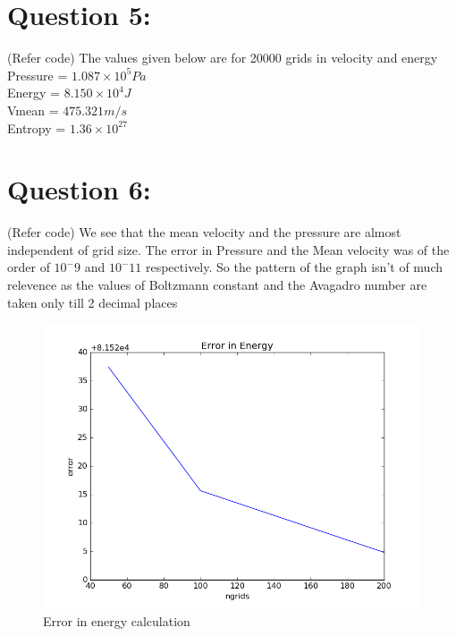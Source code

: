 \documentclass[11pt, a4paper]{article}
\begin{document}
\section{Question 5:}
(Refer code)
The values  given below are for 20000 grids in velocity and energy \\
Pressure = $1.087 \times 10^5 Pa$ \\
Energy = $8.150 \times 10^4 J$ \\
Vmean = $475.321 m/s$ \\
Entropy = $1.36 \times 10^27$\\


\section{Question 6:}
(Refer code)
We see that the mean velocity and the pressure are almost independent of grid size. The error in Pressure and the Mean 
velocity was of the order of $10^-9$ and $10^-11$ respectively. So the pattern of the graph isn't of much relevence
as the values of Boltzmann constant and the Avagadro number are taken only till 2 decimal places

\begin{figure}[H]
 \centering
 \includegraphics[scale = 0.5]{Error_e.png}
 \caption{Error in energy calculation}
 \label{fig:energy_error}
\end{figure}
\end{document}

